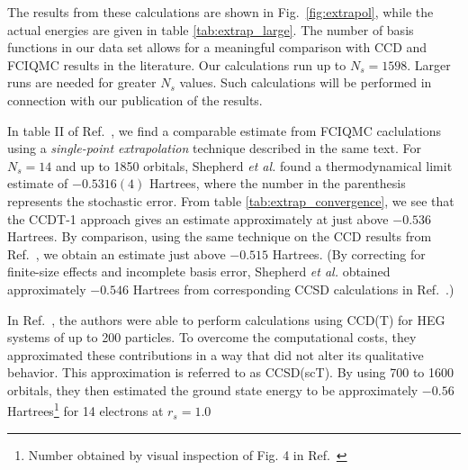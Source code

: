 The results from these calculations are shown in
Fig.~\ref{fig:extrapol}, while the actual energies are given in table
\ref{tab:extrap_large}. The number of basis functions in our data set
allows for a meaningful comparison with CCD and FCIQMC results in the
literature. Our calculations run up to $N_s = 1598$. Larger runs are needed for greater $N_s$
values. Such calculations will be performed in connection with our publication of the results. 


In table II of Ref.~\cite{Shepherd2012}, we find a comparable
estimate from FCIQMC caclulations using a \emph{single-point extrapolation} 
technique described in the same text. For $N_s=14$
and up to 1850 orbitals, Shepherd \emph{et al.} found a
thermodynamical limit estimate of $-0.5316(4)$ Hartrees, where the
number in the parenthesis represents the stochastic error. From table
\ref{tab:extrap_convergence}, we see that the CCDT-1 approach gives an estimate
approximately at just above $-0.536$ Hartrees. By comparison, using
the same technique on the CCD results from Ref.~\cite{Baardsen2015},
we obtain an estimate just above $-0.515$ Hartrees. (By correcting for
finite-size effects and incomplete basis error, Shepherd \emph{et al.}
obtained approximately $-0.546$ Hartrees from corresponding CCSD
calculations in Ref.~\cite{Shepherd2013}.)

In Ref.~\cite{Shepherd2013}, the authors were able to perform calculations
using CCD(T) for HEG systems of up to 200 particles. To overcome the
computational costs, they approximated these contributions in a way
that did not alter its qualitative behavior.  This approximation is
referred to as CCSD(scT). By using 700 to 1600 orbitals, they then
estimated the ground state energy to be approximately $-0.56$
Hartrees\footnote{Number obtained by visual inspection of Fig. 4 in
  Ref.~\cite{Shepherd2013}} for 14 electrons at $r_s = 1.0$


